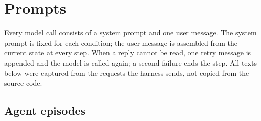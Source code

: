 \section{Prompts}\label{app:prompts}

Every model call consists of a system prompt and one user message.
The system prompt is fixed for each condition; the user message is assembled from the current state at every step.
When a reply cannot be read, one retry message is appended and the model is called again; a second failure ends the step.
All texts below were captured from the requests the harness sends, not copied from the source code.

\subsection{Agent episodes}\label{app:prompts:episodes}


